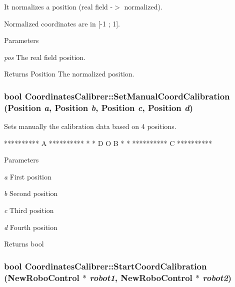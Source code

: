 It normalizes a position (real field -\/$>$ normalized). 

Normalized coordinates are in \mbox{[}-\/1 ; 1\mbox{]}.


\begin{DoxyParams}{Parameters}
\item[{\em pos}]The real field position. \end{DoxyParams}
\begin{DoxyReturn}{Returns}
Position The normalized position. 
\end{DoxyReturn}
\hypertarget{classCoordinatesCalibrer_a006c18905b14e4780b9fc74fe26649fc}{
\subsubsection[{SetManualCoordCalibration}]{\setlength{\rightskip}{0pt plus 5cm}bool CoordinatesCalibrer::SetManualCoordCalibration (Position {\em a}, \/  Position {\em b}, \/  Position {\em c}, \/  Position {\em d})}}
\label{classCoordinatesCalibrer_a006c18905b14e4780b9fc74fe26649fc}


Sets manually the calibration data based on 4 positions. 

\begin{DoxyVerb}

 ********** A **********
 *                     *
 D          O          B
 *                     *
 ********** C **********
 \end{DoxyVerb}



\begin{DoxyParams}{Parameters}
\item[{\em a}]First position \item[{\em b}]Second position \item[{\em c}]Third position \item[{\em d}]Fourth position \end{DoxyParams}
\begin{DoxyReturn}{Returns}
bool 
\end{DoxyReturn}
\hypertarget{classCoordinatesCalibrer_a2087994adbb8651efcb06e3d7a2315da}{
\subsubsection[{StartCoordCalibration}]{\setlength{\rightskip}{0pt plus 5cm}bool CoordinatesCalibrer::StartCoordCalibration ({\bf NewRoboControl} $\ast$ {\em robot1}, \/  {\bf NewRoboControl} $\ast$ {\em robot2})}}
\label{classCoordinatesCalibrer_a2087994adbb8651efcb06e3d7a2315da}


